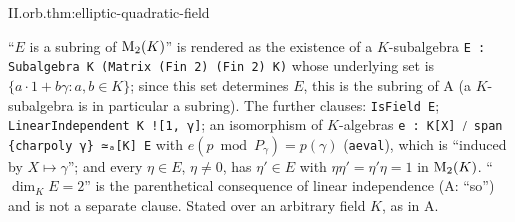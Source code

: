\begin{theorem}
\end{theorem}
\begin{tfformal}{II.orb.thm:elliptic-quadratic-field}
\begin{tffidelity}
``$E$ is a subring of $\mathrm{M}_2(K)$'' is rendered as the existence of a $K$-subalgebra \texttt{E : Subalgebra K (Matrix (Fin 2) (Fin 2) K)} whose underlying set is $\{a\cdot1+b\gamma:a,b\in K\}$; since this set determines $E$, this is the subring of A (a $K$-subalgebra is in particular a subring). The further clauses: \texttt{IsField E}; \texttt{LinearIndependent K ![1, γ]}; an isomorphism of $K$-algebras \texttt{e : K[X] ⧸ span \{charpoly γ\} ≃ₐ[K] E} with $e(p\bmod P_\gamma)=p(\gamma)$ (\texttt{aeval}), which is ``induced by $X\mapsto\gamma$''; and every $\eta\in E$, $\eta\ne0$, has $\eta'\in E$ with $\eta\eta'=\eta'\eta=1$ in $\mathrm{M}_2(K)$. ``$\dim_KE=2$'' is the parenthetical consequence of linear independence (A: ``so'') and is not a separate clause. Stated over an arbitrary field $K$, as in A.
\end{tffidelity}
\end{tfformal}
